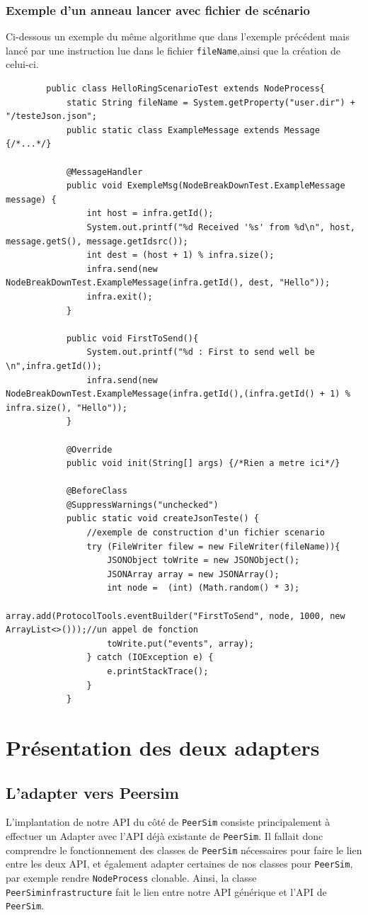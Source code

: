 \documentclass{article}
\begin{document}
							\subsubsection{Exemple d'un anneau lancer avec fichier de scénario}
						Ci-dessous un exemple du même algorithme que dans l'exemple précédent mais lancé par une instruction lue dans le fichier \verb|fileName|,ainsi que 
						la création de celui-ci.
						\begin{lstlisting}
		public class HelloRingScenarioTest extends NodeProcess{
			static String fileName = System.getProperty("user.dir") + "/testeJson.json";
			public static class ExampleMessage extends Message {/*...*/}
		
			@MessageHandler
			public void ExempleMsg(NodeBreakDownTest.ExampleMessage message) {
				int host = infra.getId();
				System.out.printf("%d Received '%s' from %d\n", host, message.getS(), message.getIdsrc());
				int dest = (host + 1) % infra.size();
				infra.send(new NodeBreakDownTest.ExampleMessage(infra.getId(), dest, "Hello"));
				infra.exit();
			}
		
			public void FirstToSend(){
				System.out.printf("%d : First to send well be \n",infra.getId());
				infra.send(new NodeBreakDownTest.ExampleMessage(infra.getId(),(infra.getId() + 1) % infra.size(), "Hello"));
			}
		
			@Override
			public void init(String[] args) {/*Rien a metre ici*/}
			
			@BeforeClass
			@SuppressWarnings("unchecked")
			public static void createJsonTeste() {
				//exemple de construction d'un fichier scenario
				try (FileWriter filew = new FileWriter(fileName)){
					JSONObject toWrite = new JSONObject();
					JSONArray array = new JSONArray();
					int node =  (int) (Math.random() * 3);
					array.add(ProtocolTools.eventBuilder("FirstToSend", node, 1000, new ArrayList<>()));//un appel de fonction
					toWrite.put("events", array);
				} catch (IOException e) {
					e.printStackTrace();
				}
			}
						\end{lstlisting}
						\newpage
							
		
						\section{Présentation des deux adapters}
						
						\subsection{L'adapter vers Peersim}
						L'implantation de notre API du côté de \verb|PeerSim| consiste principalement à effectuer un Adapter avec l'API déjà existante de \verb|PeerSim|. Il fallait donc comprendre le fonctionnement des classes de \verb|PeerSim| nécessaires pour faire le lien entre les deux API,  
						et également adapter certaines de nos classes pour \verb|PeerSim|, par exemple rendre \verb|NodeProcess| clonable. 
						\newline
						Ainsi, la classe \verb|PeerSiminfrastructure| fait le lien entre notre API générique et l'API de \verb|PeerSim|.
\end{document}
